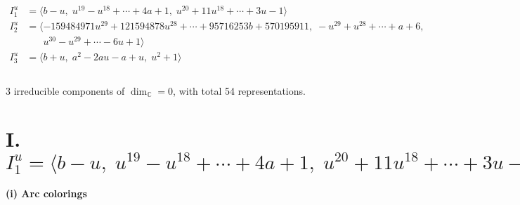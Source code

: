 \documentclass[1p]{elsarticle_modified}
\theoremstyle{definition}
\begin{document}
\begin{align*}
I^u_{1}&=\langle 
b- u,\;u^{19}- u^{18}+\cdots+4 a+1,\;u^{20}+11 u^{18}+\cdots+3 u-1\rangle \\
I^u_{2}&=\langle 
-159484971 u^{29}+121594878 u^{28}+\cdots+95716253 b+570195911,\;- u^{29}+u^{28}+\cdots+a+6,\\
\phantom{I^u_{2}}&\phantom{= \langle  }u^{30}- u^{29}+\cdots-6 u+1\rangle \\
I^u_{3}&=\langle 
b+u,\;a^2-2 a u- a+u,\;u^2+1\rangle \\
\\
\end{align*}
\raggedright * 3 irreducible components of $\dim_{\mathbb{C}}=0$, with total 54 representations.\\
\newpage
\renewcommand{\arraystretch}{1}
\centering \section*{I. $I^u_{1}= \langle b- u,\;u^{19}- u^{18}+\cdots+4 a+1,\;u^{20}+11 u^{18}+\cdots+3 u-1 \rangle$}
\flushleft \textbf{(i) Arc colorings}\\
\end{document}
